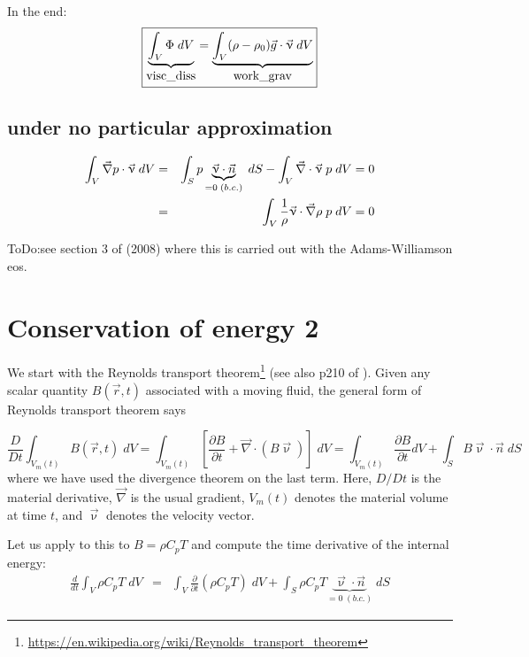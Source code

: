 In the end:
\begin{equation}
\boxed{
\underbrace{\int_V \Phi \;  dV }_{\lstinline{visc_diss}}
=
\underbrace{\int_V (\rho-\rho_0) \vec{g} \cdot \vec{\upnu} \; dV }_{\lstinline{work_grav}}
}
\label{ba003}
\end{equation}


\subsection*{under no particular approximation}

\begin{eqnarray}
\int_V \vec{\nabla} p \cdot \vec{\upnu} \; dV  
&=& \int_S p \underbrace{ \vec{\upnu}\cdot \vec{n}}_{=0 \; (b.c.)} \; dS 
-\int_V \vec{\nabla} \cdot \vec{\upnu} \; p \; dV = 0  \nonumber\\
&=&  \int_V \frac{1}{\rho} \vec{\upnu} \cdot \vec{\nabla} \rho \; p \; dV = 0  
\end{eqnarray}

{\color{red} ToDo}:see section 3 of \textcite{lezh08} (2008) 
where this is carried out with the Adams-Williamson eos.



\section*{Conservation of energy 2}

We start with the Reynolds transport 
theorem\footnote{\url{https://en.wikipedia.org/wiki/Reynolds_transport_theorem}} 
(see also p210 of \textcite{malvern}).
Given any scalar quantity $B(\vec{r},t)$ associated with a moving fluid, 
the general form of Reynolds transport theorem says 

\[
\frac{D}{Dt} \int_{V_m(t)} B(\vec{r},t) \; dV 
= \int_{V_m(t)} \left[ \frac{\partial B}{\partial t} + \vec\nabla \cdot( B \vec{\upnu})   \right]  \; dV 
=\int_{V_m(t)}  \frac{\partial B}{\partial t}  dV + \int_S B   \vec{\upnu} \cdot \vec{n} \; dS
\]
where we have used the divergence theorem on the last term.
Here, $D/Dt$ is the material derivative, $\vec\nabla$ 
is the usual gradient, $V_m(t)$ denotes the material volume at time $t$, 
and $\vec\upnu$ denotes the velocity vector.

Let us apply to this to $B=\rho C_p T$ and compute the time 
derivative of the internal energy:
\begin{eqnarray}
\frac{d}{dt} \int_V \rho C_p T \; dV 
&=& \int_V \frac{\partial }{\partial t} (\rho C_p T ) \; dV 
+ \int_S \rho C_p T  \underbrace{ \vec{\upnu}\cdot \vec{n}}_{=0 \; (b.c.)} \; dS 
\end{eqnarray}

